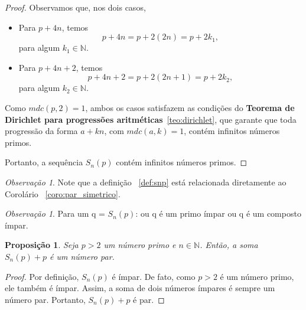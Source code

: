 \documentclass[a4paper,11pt]{article}
\newtheorem{proposition}[theorem]{Proposição}
\theoremstyle{definition}
\theoremstyle{remark}
\newtheorem{remark}[theorem]{Observação}
\begin{document}
	\begin{proof}
		Observamos que, nos dois casos,
		\begin{itemize}
			\item Para \(p + 4n\), temos
			\[
			p + 4n = p + 2(2n) = p + 2k_1,
			\]
			para algum \(k_1 \in \mathbb{N}\).
			
			\item Para \(p + 4n + 2\), temos
			\[
			p + 4n + 2 = p + 2(2n + 1) = p + 2k_2,
			\]
			para algum \(k_2 \in \mathbb{N}\).
		\end{itemize}
		
		Como \(mdc(p, 2) = 1\), ambos os casos satisfazem as condições do  \textbf{Teorema de Dirichlet para progressões aritméticas}~\ref{teo:dirichlet}, que garante que toda progressão da forma \(a + kn\), com \(mdc(a, k) = 1\), contém infinitos números primos.
		
		Portanto, a sequência \(S_n(p)\) contém infinitos números primos.
	\end{proof}
	
	\begin{remark}
		Note que a definição ~\ref{def:snp} está relacionada diretamente ao Corolário ~\ref{coro:par_simetrico}.
	\end{remark}
	
	\begin{remark}
		Para um q = \(S_n(p)\): ou q é um primo ímpar ou q é um composto ímpar.
	\end{remark}
	
	\begin{proposition}
		Seja \( p > 2 \) um número primo e \( n \in \mathbb{N} \). Então, a soma \( S_n(p) + p \) é um número par.
	\end{proposition}
	
	
	\begin{proof}
		Por definição, \( S_n(p) \) é ímpar. De fato, como \( p > 2 \) é um número primo, ele também é ímpar. Assim, a soma de dois números ímpares é sempre um número par. Portanto, \( S_n(p) + p \) é par. 
	\end{proof}
	
	
	
	
\end{document}

